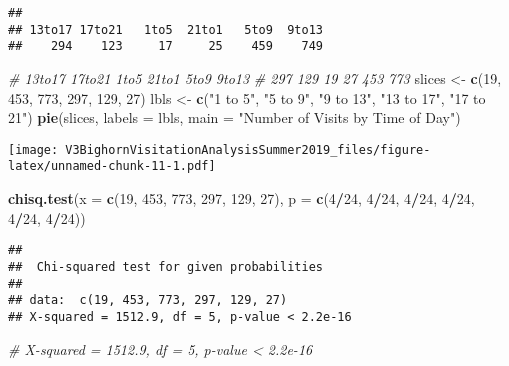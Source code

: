 \documentclass[]{article}
\newenvironment{Shaded}{\begin{snugshade}}{\end{snugshade}}
\newcommand{\CommentTok}[1]{\textcolor[rgb]{0.56,0.35,0.01}{\textit{#1}}}
\newcommand{\DataTypeTok}[1]{\textcolor[rgb]{0.13,0.29,0.53}{#1}}
\newcommand{\DecValTok}[1]{\textcolor[rgb]{0.00,0.00,0.81}{#1}}
\newcommand{\KeywordTok}[1]{\textcolor[rgb]{0.13,0.29,0.53}{\textbf{#1}}}
\newcommand{\NormalTok}[1]{#1}
\newcommand{\OperatorTok}[1]{\textcolor[rgb]{0.81,0.36,0.00}{\textbf{#1}}}
\newcommand{\StringTok}[1]{\textcolor[rgb]{0.31,0.60,0.02}{#1}}
\begin{document}
\begin{verbatim}
## 
## 13to17 17to21   1to5  21to1   5to9  9to13 
##    294    123     17     25    459    749
\end{verbatim}

\begin{Shaded}
\begin{Highlighting}[]
\CommentTok{# 13to17 17to21   1to5  21to1   5to9  9to13}
\CommentTok{#   297    129     19     27    453    773}
\NormalTok{slices <-}\StringTok{ }\KeywordTok{c}\NormalTok{(}\DecValTok{19}\NormalTok{, }\DecValTok{453}\NormalTok{, }\DecValTok{773}\NormalTok{, }\DecValTok{297}\NormalTok{, }\DecValTok{129}\NormalTok{, }\DecValTok{27}\NormalTok{)}
\NormalTok{lbls <-}\StringTok{ }\KeywordTok{c}\NormalTok{(}\StringTok{"1 to 5"}\NormalTok{, }\StringTok{"5 to 9"}\NormalTok{, }\StringTok{"9 to 13"}\NormalTok{, }\StringTok{"13 to 17"}\NormalTok{, }\StringTok{"17 to 21"}\NormalTok{)}
\KeywordTok{pie}\NormalTok{(slices, }\DataTypeTok{labels =}\NormalTok{ lbls, }\DataTypeTok{main =} \StringTok{"Number of Visits by Time of Day"}\NormalTok{)}
\end{Highlighting}
\end{Shaded}

\texttt{[image: V3BighornVisitationAnalysisSummer2019\_files/figure-latex/unnamed-chunk-11-1.pdf]}

\begin{Shaded}
\begin{Highlighting}[]
\KeywordTok{chisq.test}\NormalTok{(}\DataTypeTok{x =} \KeywordTok{c}\NormalTok{(}\DecValTok{19}\NormalTok{, }\DecValTok{453}\NormalTok{, }\DecValTok{773}\NormalTok{, }\DecValTok{297}\NormalTok{, }\DecValTok{129}\NormalTok{, }\DecValTok{27}\NormalTok{), }\DataTypeTok{p =} \KeywordTok{c}\NormalTok{(}\DecValTok{4}\OperatorTok{/}\DecValTok{24}\NormalTok{, }\DecValTok{4}\OperatorTok{/}\DecValTok{24}\NormalTok{, }\DecValTok{4}\OperatorTok{/}\DecValTok{24}\NormalTok{, }\DecValTok{4}\OperatorTok{/}\DecValTok{24}\NormalTok{, }\DecValTok{4}\OperatorTok{/}\DecValTok{24}\NormalTok{, }\DecValTok{4}\OperatorTok{/}\DecValTok{24}\NormalTok{))}
\end{Highlighting}
\end{Shaded}

\begin{verbatim}
## 
##  Chi-squared test for given probabilities
## 
## data:  c(19, 453, 773, 297, 129, 27)
## X-squared = 1512.9, df = 5, p-value < 2.2e-16
\end{verbatim}

\begin{Shaded}
\begin{Highlighting}[]
\CommentTok{# X-squared = 1512.9, df = 5, p-value < 2.2e-16}
\end{Highlighting}
\end{Shaded}
\end{document}
